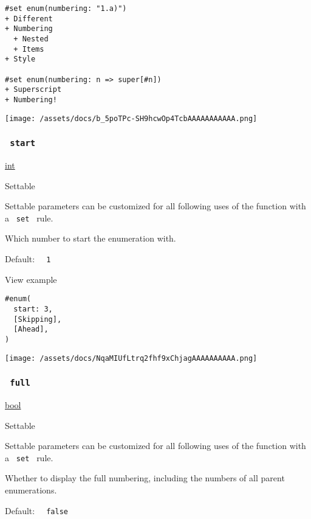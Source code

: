 \begin{verbatim}
#set enum(numbering: "1.a)")
+ Different
+ Numbering
  + Nested
  + Items
+ Style

#set enum(numbering: n => super[#n])
+ Superscript
+ Numbering!
\end{verbatim}

\texttt{[image: /assets/docs/b\_5poTPc-SH9hcwOp4TcbAAAAAAAAAAA.png]}

\subsubsection{\texorpdfstring{\texttt{\ start\ }}{ start }}\label{parameters-start}

\href{/docs/reference/foundations/int/}{int}

{{ Settable }}

\label{parameters-start-settable-tooltip}
Settable parameters can be customized for all following uses of the
function with a \texttt{\ set\ } rule.

Which number to start the enumeration with.

Default: \texttt{\ }{\texttt{\ 1\ }}\texttt{\ }


View example

\begin{verbatim}
#enum(
  start: 3,
  [Skipping],
  [Ahead],
)
\end{verbatim}

\texttt{[image: /assets/docs/NqaMIUfLtrq2fhf9xChjagAAAAAAAAAA.png]}

\subsubsection{\texorpdfstring{\texttt{\ full\ }}{ full }}\label{parameters-full}

\href{/docs/reference/foundations/bool/}{bool}

{{ Settable }}

\label{parameters-full-settable-tooltip}
Settable parameters can be customized for all following uses of the
function with a \texttt{\ set\ } rule.

Whether to display the full numbering, including the numbers of all
parent enumerations.

Default: \texttt{\ }{\texttt{\ false\ }}\texttt{\ }

